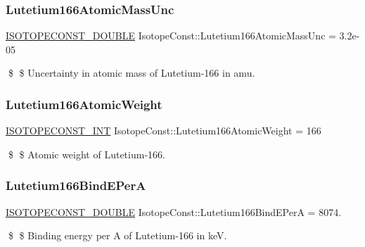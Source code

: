 \subsubsection{\texorpdfstring{Lutetium166\+Atomic\+Mass\+Unc}{Lutetium166AtomicMassUnc}}
{\footnotesize\ttfamily \mbox{\hyperlink{group___isotope_const-_macros_ga8f45a7272ce02c0b4c65c44636ed719a}{I\+S\+O\+T\+O\+P\+E\+C\+O\+N\+S\+T\+\_\+\+D\+O\+U\+B\+LE}} Isotope\+Const\+::\+Lutetium166\+Atomic\+Mass\+Unc = 3.\+2e-\/05}

\$ \$ Uncertainty in atomic mass of Lutetium-\/166 in amu. \mbox{\label{group___isotope_const-_lutetium-_lu166_gae1021ca109f5d56c37c11297018a1b40}} 
\subsubsection{\texorpdfstring{Lutetium166\+Atomic\+Weight}{Lutetium166AtomicWeight}}
{\footnotesize\ttfamily \mbox{\hyperlink{group___isotope_const-_macros_ga5f18360b3e99483a35c32d789e62621c}{I\+S\+O\+T\+O\+P\+E\+C\+O\+N\+S\+T\+\_\+\+I\+NT}} Isotope\+Const\+::\+Lutetium166\+Atomic\+Weight = 166}

\$ \$ Atomic weight of Lutetium-\/166. \mbox{\label{group___isotope_const-_lutetium-_lu166_gac1c9ff26f59c282328a3a23387a6655a}} 
\subsubsection{\texorpdfstring{Lutetium166\+Bind\+E\+PerA}{Lutetium166BindEPerA}}
{\footnotesize\ttfamily \mbox{\hyperlink{group___isotope_const-_macros_ga8f45a7272ce02c0b4c65c44636ed719a}{I\+S\+O\+T\+O\+P\+E\+C\+O\+N\+S\+T\+\_\+\+D\+O\+U\+B\+LE}} Isotope\+Const\+::\+Lutetium166\+Bind\+E\+PerA = 8074.}

\$ \$ Binding energy per A of Lutetium-\/166 in keV. \mbox{\label{group___isotope_const-_lutetium-_lu166_gacdf16aac319f89c890b09e0d490399d5}} 
